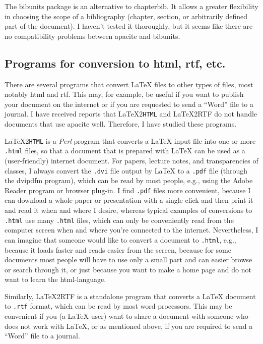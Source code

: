 \documentclass{article}
\newcommand{\latextohtml}{\textup{\LaTeX2\texttt{HTML}}}%
\newcommand{\LaTeXrtf}{\textup{\LaTeX2RTF}}%
\newcommand{\Perl}{\textsl{Perl}}%
\newcommand{\pkg}[1]{\textsf{#1}}%
\newcommand{\fname}[1]{\texttt{#1}}%
\begin{document}
The \pkg{bibunits} package is an alternative to \pkg{chapterbib}. It allows a
greater flexibility in choosing the scope of a bibliography (chapter, section,
or arbitrarily defined part of the document). I haven't tested it thoroughly,
but it seems like there are no compatibility problems between \pkg{apacite}
and \pkg{bibunits}.

\subsection{Programs for conversion to html, rtf, etc.}
There are several programs that convert \LaTeX{} files to other types
of files, most notably html and rtf. This may, for example, be useful if you
want to publish your document on the internet or if you are requested to send
a ``Word'' file to a journal. I have received reports that \latextohtml{}
and \LaTeXrtf{} do not handle documents that use \pkg{apacite} well.
Therefore, I have studied these programs.

\latextohtml{} is a \Perl{} program that converts a \LaTeX{} input
file into one or more \fname{.html} files, so that a document that is prepared
with \LaTeX{} can be used as a (user-friendly) internet document. For papers,
lecture notes, and transparencies of classes, I always convert the
\fname{.dvi} file output by \LaTeX{} to a \fname{.pdf} file (through the
\pkg{dvipdfm} program), which can be read by most people, e.g., using the
\pkg{Adobe Reader} program or browser plug-in. I find \fname{.pdf} files
more convenient, because I can download a whole paper or presentation
with a single click and then print it and read it when and where I desire,
whereas typical examples of conversions to \fname{.html} use many
\fname{.html} files, which can only be conveniently read from the computer
screen when and where you're connected to the internet. Nevertheless, I can
imagine that someone would like to convert a document to \fname{.html}, e.g.,
because it loads faster and reads easier from the screen, because for some
documents most people will have to use only a small part and can easier browse
or search through it, or just because you want to make a home page and do not
want to learn the html-language.

Similarly, \LaTeXrtf{} is a standalone program that converts a \LaTeX{}
document to \fname{.rtf} format, which can be read by most word processors.
This may be convenient if you (a \LaTeX{} user) want to share a document with
someone who does not work with \LaTeX{}, or as mentioned above, if you are
required to send a ``Word'' file to a journal.
\end{document}
